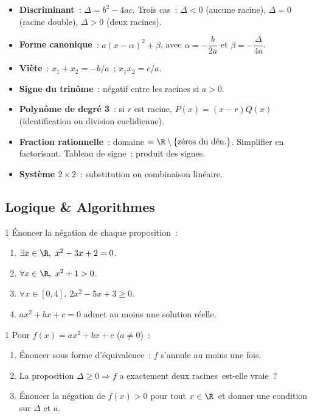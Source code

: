 \begin{bilan}
\begin{itemize}
  \item \textbf{Discriminant}~: $\Delta = b^2-4ac$.
        Trois cas~: $\Delta<0$ (aucune racine), $\Delta=0$ (racine double),
        $\Delta>0$ (deux racines).
  \item \textbf{Forme canonique}~: $a(x-\alpha)^2+\beta$,
        avec $\alpha=-\dfrac{b}{2a}$ et $\beta=-\dfrac{\Delta}{4a}$.
  \item \textbf{Vi\`ete}~: $x_1+x_2=-b/a$~; $x_1 x_2=c/a$.
  \item \textbf{Signe du trin\^ome}~: n\'egatif entre les racines si $a>0$.
  \item \textbf{Polyn\^ome de degr\'e 3}~: si $r$ est racine,
        $P(x)=(x-r)Q(x)$ (identification ou division euclidienne).
  \item \textbf{Fraction rationnelle}~: domaine $=\R\setminus\{\text{z\'eros du d\'en.}\}$.
        Simplifier en factorisant. Tableau de signe~: produit des signes.
  \item \textbf{Syst\`eme $2\times2$}~: substitution ou combinaison lin\'eaire.
\end{itemize}
\end{bilan}

\subsection*{Logique \& Algorithmes}

\begin{exo}{1}
\'Enoncer la n\'egation de chaque proposition~:
\begin{enumerate}
  \item $\exists x\in\R,\ x^2-3x+2=0$.
  \item $\forall x\in\R,\ x^2+1>0$.
  \item $\forall x\in[0,4],\ 2x^2-5x+3\geq0$.
  \item \og $ax^2+bx+c=0$ admet au moins une solution r\'eelle.\fg
\end{enumerate}
\end{exo}

\begin{exo}{1}
Pour $f(x)=ax^2+bx+c$ ($a\ne0$)~:
\begin{enumerate}
  \item \'Enoncer sous forme d'\'equivalence~:
        \og $f$ s'annule au moins une fois.\fg
  \item La proposition \og $\Delta\geq0\Rightarrow f$ a exactement deux racines\fg\
        est-elle vraie~?
  \item \'Enoncer la n\'egation de \og $f(x)>0$ pour tout $x\in\R$\fg\
        et donner une condition sur $\Delta$ et $a$.
\end{enumerate}
\end{exo}

